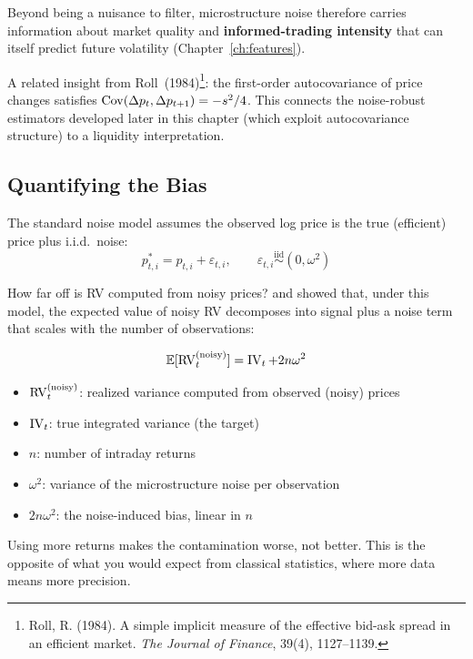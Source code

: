 Beyond being a nuisance to filter, microstructure noise therefore carries information about market quality and \textbf{informed-trading intensity} that can itself predict future volatility (Chapter~\ref{ch:features}).

A related insight from Roll~(1984)\footnote{Roll, R. (1984). A simple implicit measure of the effective bid-ask spread in an efficient market. \textit{The Journal of Finance}, 39(4), 1127--1139.}: the first-order autocovariance of price changes satisfies $\operatorname{Cov}(\Delta p_t, \Delta p_{t+1}) = -s^2/4$.
This connects the noise-robust estimators developed later in this chapter (which exploit autocovariance structure) to a liquidity interpretation.

\subsection{Quantifying the Bias}

The standard noise model assumes the observed log price is the true (efficient) price plus i.i.d.\ noise:
\[
  p^*_{t,i} = p_{t,i} + \varepsilon_{t,i}, \qquad \varepsilon_{t,i} \overset{\text{iid}}{\sim} (0, \omega^2)
\]

How far off is RV computed from noisy prices?
\citet{HansenLunde2006} and \citet{AitSahaliaMyklandZhang2005} showed that, under this model, the expected value of noisy RV decomposes into signal plus a noise term that scales with the number of observations:

\begin{equation}
  \mathbb{E}[\operatorname{RV}_t^{(\text{noisy})}] = \operatorname{IV}_t + 2n\omega^2
  \label{eq:rv-noise-bias}
\end{equation}
\begin{itemize}[nosep]
  \item $\operatorname{RV}_t^{(\text{noisy})}$: realized variance computed from observed (noisy) prices
  \item $\operatorname{IV}_t$: true integrated variance (the target)
  \item $n$: number of intraday returns
  \item $\omega^2$: variance of the microstructure noise per observation
  \item $2n\omega^2$: the noise-induced bias, linear in $n$
\end{itemize}

\begin{intuition}
Using more returns makes the contamination worse, not better.
This is the opposite of what you would expect from classical statistics, where more data means more precision.
\end{intuition}

